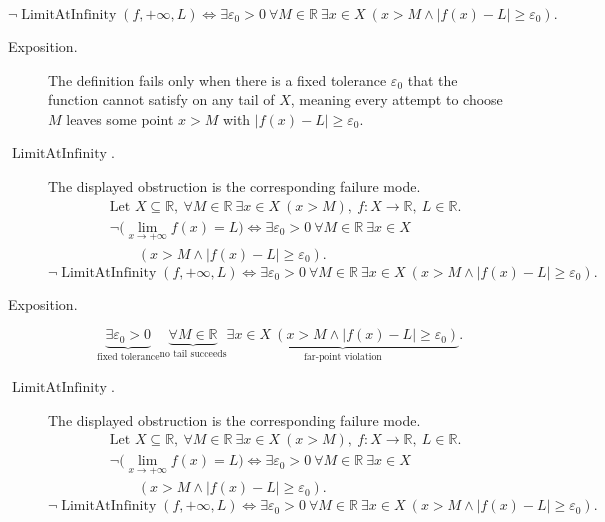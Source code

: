 \begin{remark*}
\[
\neg\operatorname{LimitAtInfinity}(f,+\infty,L) \Longleftrightarrow \exists \varepsilon_0 > 0\ \forall M \in \mathbb{R}\ \exists x \in X\ (x > M \land |f(x) - L| \ge \varepsilon_0).
\]
\end{remark*}

\begin{remark*}
\begin{description}
  \item[Exposition.]
The definition fails only when there is a fixed tolerance $\varepsilon_0$ that the function cannot satisfy on any tail of $X$, meaning every attempt to choose $M$ leaves some point $x > M$ with $|f(x) - L| \ge \varepsilon_0$.


  \item[\(\operatorname{LimitAtInfinity}.\)]
  The displayed obstruction is the corresponding failure mode.
  \[
\begin{aligned}
&\text{Let } X \subseteq \mathbb{R},\ \forall M \in \mathbb{R}\ \exists x \in X\ (x > M),\ f : X \to \mathbb{R},\ L \in \mathbb{R}.\\
&\neg\bigl(\lim_{x \to +\infty} f(x) = L\bigr) \Longleftrightarrow \exists \varepsilon_0 > 0\ \forall M \in \mathbb{R}\ \exists x \in X\\
&\qquad (x > M \land |f(x) - L| \ge \varepsilon_0).
\end{aligned}
  \]
  \[
\neg\operatorname{LimitAtInfinity}(f,+\infty,L) \Longleftrightarrow \exists \varepsilon_0 > 0\ \forall M \in \mathbb{R}\ \exists x \in X\ (x > M \land |f(x) - L| \ge \varepsilon_0).
  \]
\end{description}
\end{remark*}

\begin{remark*}
\begin{description}
  \item[Exposition.]
\[
\underbrace{\exists \varepsilon_0 > 0}_{\text{fixed tolerance}}
\underbrace{\forall M \in \mathbb{R}}_{\text{no tail succeeds}}
\underbrace{\exists x \in X\ (x > M \land |f(x) - L| \ge \varepsilon_0)}_{\text{far-point violation}}.
\]


  \item[\(\operatorname{LimitAtInfinity}.\)]
  The displayed obstruction is the corresponding failure mode.
  \[
\begin{aligned}
&\text{Let } X \subseteq \mathbb{R},\ \forall M \in \mathbb{R}\ \exists x \in X\ (x > M),\ f : X \to \mathbb{R},\ L \in \mathbb{R}.\\
&\neg\bigl(\lim_{x \to +\infty} f(x) = L\bigr) \Longleftrightarrow \exists \varepsilon_0 > 0\ \forall M \in \mathbb{R}\ \exists x \in X\\
&\qquad (x > M \land |f(x) - L| \ge \varepsilon_0).
\end{aligned}
  \]
  \[
\neg\operatorname{LimitAtInfinity}(f,+\infty,L) \Longleftrightarrow \exists \varepsilon_0 > 0\ \forall M \in \mathbb{R}\ \exists x \in X\ (x > M \land |f(x) - L| \ge \varepsilon_0).
  \]
\end{description}
\end{remark*}


